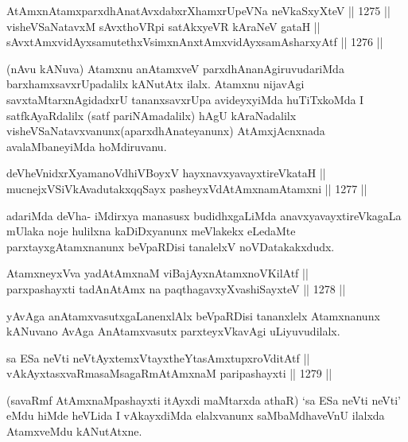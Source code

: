 \begin{shl}
AtAmx\s nAtamxparxdhAnatAvxdabxrXhamxrUpeVNa neVkaSxyXteV \hfill || 1275 ||  \\
visheVSaNatavxM sAvxthoVR\s pi satAkxyeVR kAraNeV gataH || \\
sAvxtAmxvidAyxsamutethxV\s simxnAnxtAmxvidAyxsamAsharxyAtf \hfill || 1276 ||  
\end{shl}

\begin{artha}
(nAvu kANuva) Atamxnu anAtamxveV parxdhAnanAgiruvudariMda barxhamxsavxrUpadalilx kANutAtx ilalx. Atamxnu nijavAgi savxtaMtarxnAgidadxrU tananxsavxrUpa avideyxyiMda huTiTxkoMda I satfkAyaRdalilx (satf pariNAmadalilx) hAgU kAraNadalilx visheVSaNatavxvanunx(aparxdhAnateyanunx) AtAmxjAcnxnada avalaMbaneyiMda hoMdiruvanu.
\end{artha}


\begin{shl}
deVheVnidxrXyamanoVdhiVBoyxV hayxnavxyavayxtireVkataH || \\
mucnejxVSiVkAvadutakxqqSayx pasheyxVdAtAmxnamAtamxni \hfill || 1277 ||  
\end{shl}

\begin{artha}
adariMda deVha- iMdirxya manasusx budidhxgaLiMda anavxyavayxtireVkagaLa mUlaka noje hulilxna kaDiDxyanunx meVlakekx eLedaMte parxtayxgAtamxnanunx beVpaRDisi tanalelxV noVDatakakxdudx.
\end{artha}

\begin{shl}
AtamxneyxVva yadA\s \s tAmxnaM viBajAyxnAtamxnoV\s KilAtf || \\
parxpashayxti tadA\s nAtAmx na paqthagavxyXvashiSayxteV \hfill || 1278 ||  
\end{shl}

\begin{artha}
yAvAga anAtamxvasutxgaLanenxlAlx beVpaRDisi tananxlelx Atamxnanunx kANuvano AvAga AnAtamxvasutx parxteyxVkavAgi uLiyuvudilalx.
\end{artha}

\begin{shl}
sa ESa neVti neVtAyxtemxVtayxtheYtasAmxtupxroVditAtf || \\
vAkAyxtasxvaRmasaMsagaRmAtAmxnaM paripashayxti \hfill || 1279 || 
\end{shl}

\begin{artha}
(savaRmf AtAmxnaMpashayxti itAyxdi maMtarxda athaR) `sa ESa neVti neVti' eMdu hiMde heVLida I vAkayxdiMda elalxvanunx saMbaMdhaveVnU ilalxda AtamxveMdu kANutAtxne.
\end{artha}

